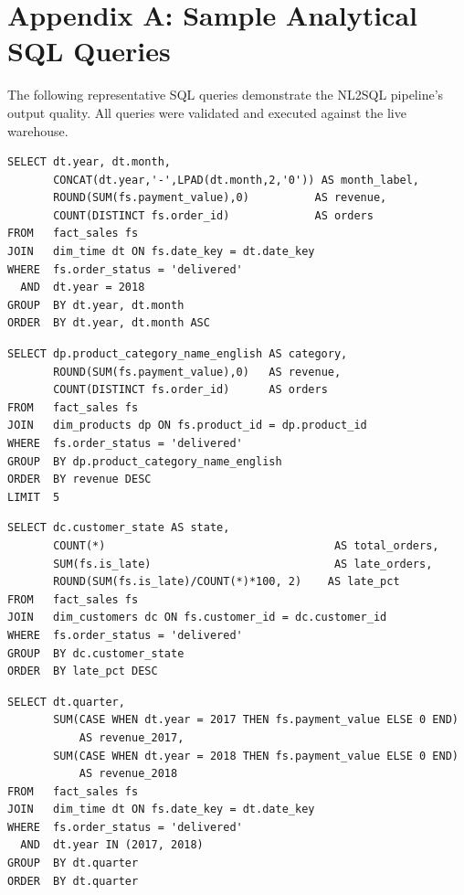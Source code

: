 \documentclass[12pt,a4paper]{report}
\begin{document}
\chapter*{Appendix A: Sample Analytical SQL Queries}

The following representative SQL queries demonstrate the NL2SQL pipeline's output quality.
All queries were validated and executed against the live warehouse.

\begin{lstlisting}[style=sqlcode, caption={Monthly revenue trend for 2018}]
SELECT dt.year, dt.month,
       CONCAT(dt.year,'-',LPAD(dt.month,2,'0')) AS month_label,
       ROUND(SUM(fs.payment_value),0)          AS revenue,
       COUNT(DISTINCT fs.order_id)             AS orders
FROM   fact_sales fs
JOIN   dim_time dt ON fs.date_key = dt.date_key
WHERE  fs.order_status = 'delivered'
  AND  dt.year = 2018
GROUP  BY dt.year, dt.month
ORDER  BY dt.year, dt.month ASC
\end{lstlisting}

\begin{lstlisting}[style=sqlcode, caption={Top 5 product categories by revenue}]
SELECT dp.product_category_name_english AS category,
       ROUND(SUM(fs.payment_value),0)   AS revenue,
       COUNT(DISTINCT fs.order_id)      AS orders
FROM   fact_sales fs
JOIN   dim_products dp ON fs.product_id = dp.product_id
WHERE  fs.order_status = 'delivered'
GROUP  BY dp.product_category_name_english
ORDER  BY revenue DESC
LIMIT  5
\end{lstlisting}

\begin{lstlisting}[style=sqlcode, caption={Late delivery rate by state (sorted worst-first)}]
SELECT dc.customer_state AS state,
       COUNT(*)                                   AS total_orders,
       SUM(fs.is_late)                            AS late_orders,
       ROUND(SUM(fs.is_late)/COUNT(*)*100, 2)    AS late_pct
FROM   fact_sales fs
JOIN   dim_customers dc ON fs.customer_id = dc.customer_id
WHERE  fs.order_status = 'delivered'
GROUP  BY dc.customer_state
ORDER  BY late_pct DESC
\end{lstlisting}

\begin{lstlisting}[style=sqlcode, caption={YoY quarterly revenue: 2017 vs 2018}]
SELECT dt.quarter,
       SUM(CASE WHEN dt.year = 2017 THEN fs.payment_value ELSE 0 END)
           AS revenue_2017,
       SUM(CASE WHEN dt.year = 2018 THEN fs.payment_value ELSE 0 END)
           AS revenue_2018
FROM   fact_sales fs
JOIN   dim_time dt ON fs.date_key = dt.date_key
WHERE  fs.order_status = 'delivered'
  AND  dt.year IN (2017, 2018)
GROUP  BY dt.quarter
ORDER  BY dt.quarter
\end{lstlisting}
\end{document}
